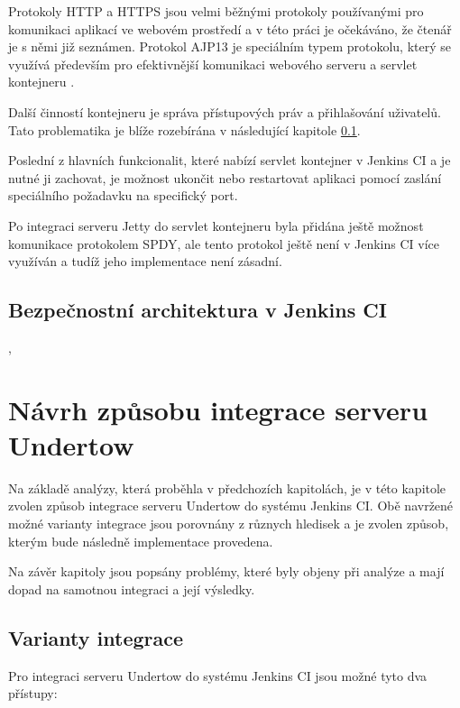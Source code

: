             Protokoly HTTP a HTTPS jsou velmi běžnými protokoly používanými pro 
            komunikaci aplikací ve webovém prostředí a v této práci je očekáváno, 
            že čtenář je s němi již seznámen. Protokol AJP13 je speciálním
            typem protokolu, který se využívá především pro efektivnější komunikaci
            webového serveru a servlet kontejneru \cite{ajp13Web}.
            
            Další činností kontejneru je správa přístupových práv a přihlašování
            uživatelů. Tato problematika je blíže rozebírána v následující 
            kapitole \ref{secSecurityArchitecture}.

            Poslední z hlavních funkcionalit, které nabízí servlet kontejner v Jenkins CI
            a je nutné ji zachovat,
            je možnost ukončit nebo restartovat aplikaci pomocí zaslání
            speciálního požadavku na specifický port. 

            Po integraci serveru Jetty do servlet kontejneru byla přidána ještě možnost
            komunikace protokolem SPDY, ale tento protokol ještě není 
            v Jenkins CI více využíván a tudíž jeho implementace není zásadní.

             
        \subsection{Bezpečnostní architektura v Jenkins CI} \label{secSecurityArchitecture}
                    \cite{securityArchitectureJenkins}, \cite{securityArchitectureWinstone}


    \section{Návrh způsobu integrace serveru Undertow}
        Na základě analýzy, která proběhla v předchozích kapitolách,
        je v této kapitole zvolen způsob
        integrace serveru Undertow do systému Jenkins CI. 
        Obě navržené možné varianty integrace jsou porovnány z různych
        hledisek a je zvolen způsob, kterým bude následně implementace provedena.

        Na závěr kapitoly jsou popsány problémy, které byly objeny při analýze a 
        mají dopad na samotnou integraci a její výsledky.
                
        \subsection{Varianty integrace}
            Pro integraci serveru Undertow do systému Jenkins CI jsou možné tyto dva přístupy:

